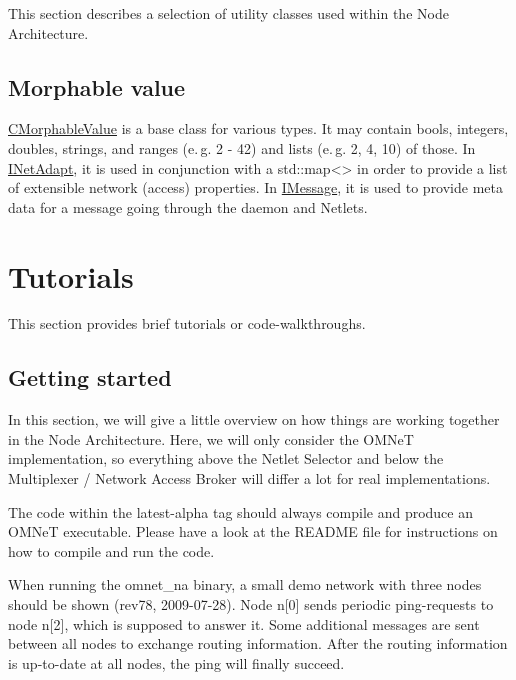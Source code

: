 This section describes a selection of utility classes used within the Node Architecture.


\subsection{Morphable value}
\label{ch:noanex:util:morph}

\hyperlink{classCMorphableValue}{CMorphableValue} is a base class for various types. It may contain bools, integers, doubles, strings, and ranges (e.\,g. {2 - 42}) and lists (e.\,g. {2, 4, 10}) of those.
In \hyperlink{classINetAdapt}{INetAdapt}, it is used in conjunction with a std::map<> in order to provide a list of extensible network (access) properties.
In \hyperlink{classIMessage}{IMessage}, it is used to provide meta data for a message going through the daemon and Netlets.



\section{Tutorials}
\label{ch:noanex:tutorials}

This section provides brief tutorials or code-walkthroughs.

\subsection{Getting started}
\label{ch:noanex:tutorials:gettingstarted}

In this section, we will give a little overview on how things are working together in the Node Architecture. Here, we will only consider the OMNeT implementation, so everything above the Netlet Selector and below the Multiplexer / Network Access Broker will differ a lot for real implementations.

The code within the latest-alpha tag should always compile and produce an OMNeT executable. Please have a look at the README file for instructions on how to compile and run the code.

When running the omnet\_\-na binary, a small demo network with three nodes should be shown (rev78, 2009-07-28). Node n\mbox{[}0\mbox{]} sends periodic ping-requests to node n\mbox{[}2\mbox{]}, which is supposed to answer it. Some additional messages are sent between all nodes to exchange routing information. After the routing information is up-to-date at all nodes, the ping will finally succeed.

